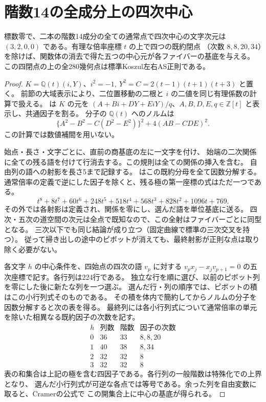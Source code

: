 \section{階数14の全成分上の四次中心}
\label{sec:rank-fourteen-center}
\begin{theorem}\label{thm:rank-fourteen-center}
標数零で、二本の階数14成分の全ての通常点で四次中心の文字次元は
$(3,2,0,0)$ である。有理な倍率座標 $t$ の上で四つの既約閉点
（次数 $8,8,20,34$）を除けば、関数体の消去で得た五つの中心元が各ファイバーの基底を与える。
この四閉点の上の全280幾何点は標準Koszul左右AS正則である。
\end{theorem}
\begin{proof}
$K=\mathbb Q(t)(i,Y)$、$i^2=-1,\ Y^2=C=2(t-1)(t+1)(t+3)$ と置く。
前節の大域表示により、二位置移動の二根と $i$ の二値を同じ有理係数の計算で扱える。
 は $K$ の元を
$(A+Bi+DY+EiY)/q$、$A,B,D,E,q\in\mathbb Z[t]$ と表示し、共通因子を割る。
分子の $\mathbb Q(t)$ へのノルムは
\[
 \{A^2-B^2-C(D^2-E^2)\}^2+4(AB-CDE)^2 .
\]
この計算では数値補間を用いない。

始点・長さ・文字ごとに、直前の商基底の左に一文字を付け、
始端の二次関係に全ての残る語を付けて行消去する。この規則は全ての関係の挿入を含む。
自由列の語への射影を長さ5まで記録する。
 はこの既約分母を全て因数分解する。
通常倍率の定義で逆にした因子を除くと、残る極の第一座標の式はただ一つである。
\[
 t^8+8t^7+60t^6+248t^5+518t^4+568t^3+828t^2+1096t+769 .
\]
その外では各射影は定義され、関係を零にし、選んだ語を単位基底に送る。
四次・五次の道空間の次元は全点で既知なので、この全射はファイバーごとに同型となる。
三次以下でも同じ結論が成り立つ（固定曲線で標準の三次交叉を持つ）。
従って掃き出しの途中のピボットが消えても、最終射影が正則な点は取り除く必要がない。

各文字 $h$ の中心条件を、四始点の四次の語 $v_p$ に対する
$v_p x_j-x_jv_{p+1}=0$ の五次座標で記す。各行列は224行である。
独立な行を順に選び、以前のピボット列を零にした後に新たな列を一つ選ぶ。
選んだ行・列の順序では、ピボットの積はこの小行列式そのものである。
その積を体内で簡約してからノルムの分子を因数分解すると次の表を得る。
最終列には各小行列式について通常倍率の単元を除いた相異なる既約因子の次数を記す。
\[
\begin{array}{c|r|r|l}
 h&\text{列数}&\text{階数}&\text{因子の次数}\\ \hline
 0&36&33&8,8,20\\
 1&40&38&8,34\\
 2&32&32&8\\
 3&32&32&8
\end{array}
\]
表の和集合は上記の極を含む四因子である。各行列の一般階数は特殊化での上界となり、
選んだ小行列式が可逆な各点では等号である。余った列を自由変数に取ると、Cramerの公式で
この開集合上に中心の基底が得られる。


\end{proof}
